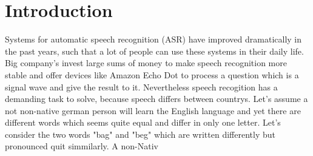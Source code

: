 %
%

\chapter{Introduction}


Systems for automatic speech recognition (ASR) have improved dramatically in the past years, such that a lot of people can use these systems in their daily life. Big company's invest large sums of money to make speech recognition more stable and offer devices like Amazon Echo Dot to process a question which is a signal wave  and give the result to it. Nevertheless speech recogition has a demanding task to solve, because speech differs between countrys. Let's assume a not non-native german person will learn the English language and yet there are different words which seems quite equal and differ in only one letter. Let's consider the two words "bag" and "beg" which are written differently but pronounced quit simmilarly. A non-Nativ

%
